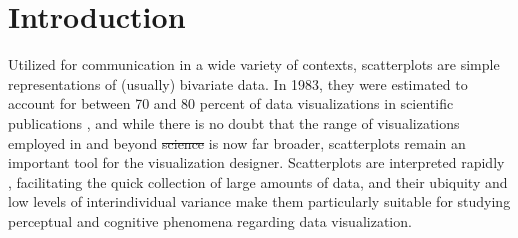 \documentclass[manuscript,screen,review,anonymous]{acmart}
\providecommand{\DIFaddtex}[1]{{\protect\color{blue}\uwave{#1}}} %
\providecommand{\DIFdeltex}[1]{{\protect\color{red}\sout{#1}}} %
\providecommand{\DIFaddbegin}{} %
\providecommand{\DIFaddend}{} %
\providecommand{\DIFdelbegin}{} %
\providecommand{\DIFdelend}{} %
\providecommand{\DIFadd}[1]{\texorpdfstring{\DIFaddtex{#1}}{#1}} %
\providecommand{\DIFdel}[1]{\texorpdfstring{\DIFdeltex{#1}}{}} %
\newcommand{\DIFscaledelfig}{0.5}
\newlength{\DIFdelgraphicswidth} %
\newlength{\DIFdelgraphicsheight} %
\newcommand{\DIFaddincludegraphics}[2][]{{\color{blue}\fbox{\DIFOincludegraphics[#1]{#2}}}} %
\newcommand{\DIFdelincludegraphics}[2][]{%
\sbox{\DIFdelgraphicsbox}{\DIFOincludegraphics[#1]{#2}}%
\settoboxwidth{\DIFdelgraphicswidth}{\DIFdelgraphicsbox} %
\settoboxtotalheight{\DIFdelgraphicsheight}{\DIFdelgraphicsbox} %
\scalebox{\DIFscaledelfig}{%
\parbox[b]{\DIFdelgraphicswidth}{\usebox{\DIFdelgraphicsbox}\\[-\baselineskip] \rule{\DIFdelgraphicswidth}{0em}}\llap{\resizebox{\DIFdelgraphicswidth}{\DIFdelgraphicsheight}{%
\setlength{\unitlength}{\DIFdelgraphicswidth}%
\begin{picture}(1,1)%
\thicklines\linethickness{2pt} %
{\color[rgb]{1,0,0}\put(0,0){\framebox(1,1){}}}%
{\color[rgb]{1,0,0}\put(0,0){\line( 1,1){1}}}%
{\color[rgb]{1,0,0}\put(0,1){\line(1,-1){1}}}%
\end{picture}%
}\hspace*{3pt}}} %
} %
\DeclareRobustCommand{\DIFaddbegin}{\DIFOaddbegin \let\includegraphics\DIFaddincludegraphics} %
\DeclareRobustCommand{\DIFaddend}{\DIFOaddend \let\includegraphics\DIFOincludegraphics} %
\DeclareRobustCommand{\DIFdelbegin}{\DIFOdelbegin \let\includegraphics\DIFdelincludegraphics} %
\DeclareRobustCommand{\DIFdelend}{\DIFOaddend \let\includegraphics\DIFOincludegraphics} %
\begin{document}



\maketitle

\setlength{\parskip}{-0.1pt}

\section{Introduction}\label{sec-intro}

Utilized for communication in a wide variety of contexts, scatterplots
are simple representations of (usually) bivariate data. In 1983, they
were estimated to account for between 70 and 80 percent of data
visualizations in scientific publications \citep{tufte_1983}, and while
there is no doubt that the range of visualizations employed in and
beyond \DIFdelbegin \DIFdel{science }\DIFdelend \DIFaddbegin \DIFadd{scientific circles }\DIFaddend is now far broader, scatterplots remain an
important tool for the visualization designer. Scatterplots are
interpreted rapidly \citep{rensink_2014}, facilitating the quick
collection of large amounts of data, and their ubiquity
\citep{tufte_1983} and low levels of interindividual variance
\citep{kay_2015} make them particularly suitable for studying perceptual
and cognitive phenomena regarding data visualization.
\end{document}
